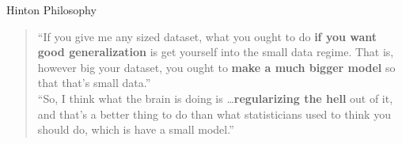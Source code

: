 \documentclass[t,xcolor=dvipsnames]{beamer}
\begin{document}
\begin{frame}{Hinton Philosophy}

\begin{quote}
``If you give me any sized dataset, what you ought to do \textbf{if you want good generalization} is get yourself into the small data regime. That is, however big your dataset, you ought to \textbf{make a much bigger model} so that that's small data.''\\

``So, I think what the brain is doing is \ldots \textbf{regularizing the hell} out of it, and that's a better thing to do than what statisticians used to think you should do, which is have a small model.'' \\
\end{quote}
\end{frame}


\datatable
{}\datatableours
{}\datatableaug
{}
\end{document}
